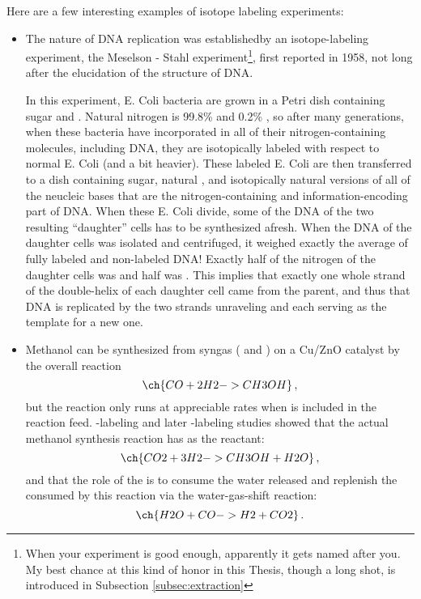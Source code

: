 Here are a few interesting examples of isotope labeling experiments:
\begin{itemize}
	\item The nature of DNA replication was establishedby an isotope-labeling experiment, the Meselson - Stahl experiment\footnote{When your experiment is good enough, apparently it gets named after you. My best chance at this kind of honor in this Thesis, though a long shot, is introduced in Subsection \ref{subsec:extraction}}, first reported in 1958, not long after the elucidation of the structure of DNA\cite{Meselson1958}. 
	
	In this experiment, E. Coli bacteria are grown in a Petri dish containing sugar and . Natural nitrogen is 99.8\%  and 0.2\% , so after many generations, when these bacteria have incorporated  in all of their nitrogen-containing molecules, including DNA, they are isotopically labeled with respect to normal E. Coli (and a bit heavier). These labeled E. Coli are then transferred to a dish containing sugar, natural , and isotopically natural versions of all of the neucleic bases that are the nitrogen-containing and information-encoding part of DNA. When these E. Coli divide, some of the DNA of the two resulting ``daughter'' cells has to be synthesized afresh. When the DNA of the daughter cells was isolated and centrifuged, it weighed exactly the average of fully labeled and non-labeled DNA! Exactly half of the nitrogen of the daughter cells was  and half was . This implies that exactly one whole strand of the double-helix of each daughter cell came from the parent, and thus that DNA is replicated by the two strands unraveling and each serving as the template for a new one.
	
	\item 
	Methanol can be synthesized from syngas ( and ) on a Cu/ZnO catalyst\cite{Concepts2003} by the overall reaction
	\begin{equation}
	\ch{CO + 2 H2 -> CH3OH}\,,
	\end{equation} 
	but the reaction only runs at appreciable rates when  is included in the reaction feed. -labeling\cite{Chinchen1987} and later -labeling studies\cite{Studt2015} showed that the actual methanol synthesis reaction has  as the reactant:
	\begin{equation}
	\ch{CO2 + 3 H2 -> CH3OH + H2O}\,,
	\end{equation}
	and that the role of the  is to consume the water released and replenish the  consumed by this reaction via the water-gas-shift reaction:
	\begin{equation}
	\ch{H2O + CO -> H2 + CO2}\,.
	\end{equation}
	

\end{itemize}
